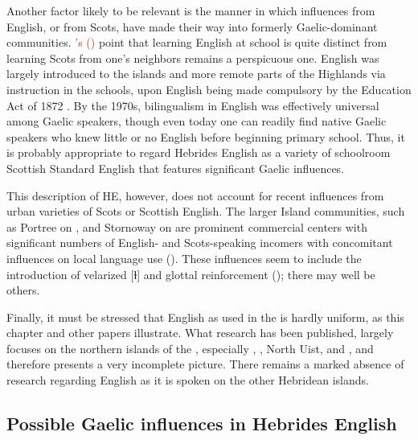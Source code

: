 \documentclass[output=paper,colorlinks,citecolor=brown]{langscibook}
\begin{document}
Another factor likely to be relevant is the manner in which influences from English, or from Scots, have made their way into formerly Gaelic-dominant communities. \textcolor{brown}{\citeauthor{Clement:1980}'s (\citeyear{Clement:1980})} point that learning English at school is quite distinct from learning Scots from one’s neighbors remains a perspicuous one. English was largely introduced to the islands and more remote parts of the Highlands via instruction in the schools, upon English being made compulsory by the Education %
Act of 1872 \citep{Withers:1984}. By the 1970s, bilingualism in English was effectively universal among Gaelic speakers, though even today one can readily find native Gaelic speakers who knew little or no English before beginning primary school. Thus, it is probably appropriate to regard Hebrides English as a variety of schoolroom Scottish Standard English that features significant Gaelic influences. 

This description of HE, however, does not account for recent influences from urban varieties of Scots or Scottish English. The larger Island communities, such as Portree on , and Stornoway on  are prominent commercial centers with significant numbers of English- and Scots-speaking incomers with concomitant influences on local language use (\citealt{Shuken:1984, Speitel:1981, Clement:1980}). These influences seem to include the introduction of velarized [ɫ] \citep{Shuken:1985} and glottal reinforcement (\citealt{Clayton:2018, Wells:1982, Trudgill:1988, Stuart-Smith:1999a, Stuart-Smith:1999b}); there may well be others.  

Finally, it must be stressed that English as used in the  is hardly uniform, as this chapter and other papers illustrate. What research has been published, largely focuses on the northern islands of the , especially , , North Uist, and , and therefore presents a very incomplete picture. There remains a marked absence of research regarding English as it is spoken on the other Hebridean islands. 

\subsection{Possible Gaelic influences in Hebrides English}\label{section 2.2}
\end{document}
